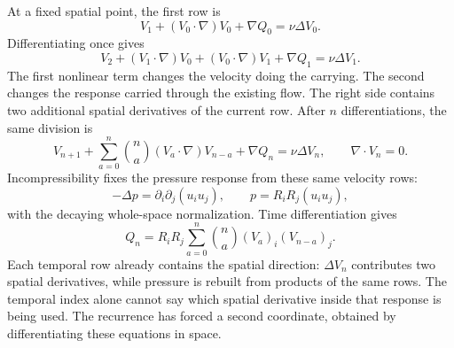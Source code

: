At a fixed spatial point, the first row is
\begin{equation}\label{eq:BodyFirstTemporalVelocityRow}
  V_1+(V_0\cdot\nabla)V_0+\nabla Q_0
  =\nu\Delta V_0.
\end{equation}
Differentiating once gives
\begin{equation}\label{eq:BodySecondTemporalVelocityRow}
  V_2
  +(V_1\cdot\nabla)V_0
  +(V_0\cdot\nabla)V_1
  +\nabla Q_1
  =\nu\Delta V_1.
\end{equation}
The first nonlinear term changes the velocity doing the carrying.
The second changes the response carried through the existing flow.
The right side contains two additional spatial derivatives of the current row.
After \(n\) differentiations, the same division is
\begin{equation}\label{eq:BodyTemporalVelocityRecurrence}
  V_{n+1}
  +\sum_{a=0}^{n}\binom{n}{a}(V_a\cdot\nabla)V_{n-a}
  +\nabla Q_n
  =\nu\Delta V_n,
  \qquad
  \nabla\cdot V_n=0.
\end{equation}
Incompressibility fixes the pressure response from these same velocity rows:
\begin{equation}\label{eq:PressureNormalization}
  -\Delta p=\partial_i\partial_j(u_i u_j),
  \qquad
  p=R_iR_j(u_i u_j),
\end{equation}
with the decaying whole-space normalization.
Time differentiation gives
\begin{equation}\label{eq:BodyTemporalPressureRecurrence}
  Q_n
  =R_iR_j\sum_{a=0}^{n}\binom{n}{a}(V_a)_i(V_{n-a})_j.
\end{equation}
Each temporal row already contains the spatial direction: \(\Delta V_n\) contributes two spatial derivatives, while pressure is rebuilt from products of the same rows.
The temporal index alone cannot say which spatial derivative inside that response is being used.
The recurrence has forced a second coordinate, obtained by differentiating these equations in space.
